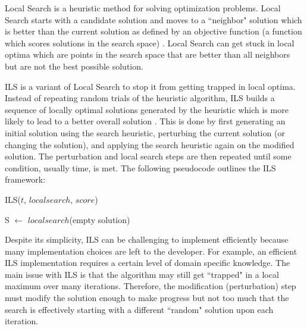 \documentclass[11pt]{article}
\begin{document}
Local Search is a heuristic method for solving optimization problems. Local Search starts with a candidate solution and moves to a ``neighbor" solution which is better than the current solution as defined by an objective function (a function which scores solutions in the search space) \cite{gendreau2010handbook}. Local Search can get stuck in local optima which are points in the search space that are better than all neighbors but are not the best possible solution.

ILS is a variant of Local Search to stop it from getting trapped in local optima. Instead of repeating random trials of the heuristic algorithm, ILS builds a sequence of locally optimal solutions generated by the heuristic which is more likely to lead to a better overall solution \cite{gendreau2010handbook}. This is done by first generating an initial solution using the search heuristic, perturbing the current solution (or changing the solution), and applying the search heuristic again on the modified solution. The perturbation and local search steps are then repeated until some condition, usually time, is met.
The following pseudocode outlines the ILS framework:

%
%
\begin{algorithm}[!h]
\caption{ILS($t$, $localsearch$, $score$)}
S $\gets$ $localsearch$(empty solution)\;
\end{algorithm}

Despite its simplicity, ILS can be challenging to implement efficiently because many implementation choices are left to the developer. For example, an efficient ILS implementation requires a certain level of domain specific knowledge. The main issue with ILS is that the algorithm may still get ``trapped" in a local maximum over many iterations. Therefore, the modification (perturbation) step must modify the solution enough to make progress but not too much that the search is effectively starting with a different ``random" solution upon each iteration. 

\end{document}
